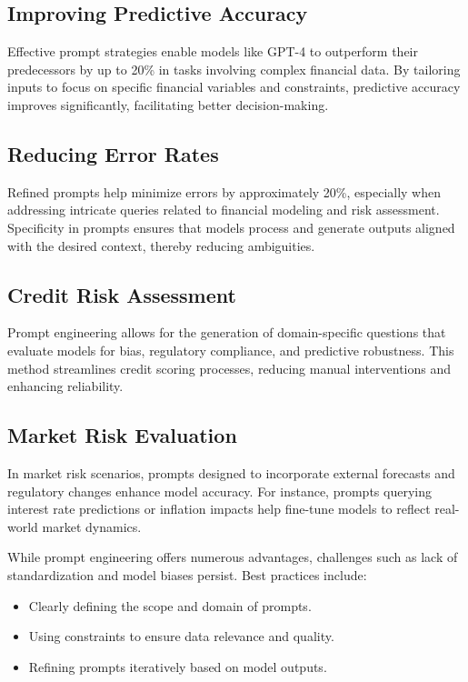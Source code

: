 \documentclass[a4paper,headinclude=on,footinclude=on,12pt,oneside]{scrbook}
\begin{document}
	
	\subsection{Improving Predictive Accuracy}
	Effective prompt strategies enable models like GPT-4 to outperform their predecessors by up to 20\% in tasks involving complex financial data. By tailoring inputs to focus on specific financial variables and constraints, predictive accuracy improves significantly, facilitating better decision-making.
	
	\subsection{Reducing Error Rates}
	Refined prompts help minimize errors by approximately 20\%, especially when addressing intricate queries related to financial modeling and risk assessment. Specificity in prompts ensures that models process and generate outputs aligned with the desired context, thereby reducing ambiguities.
	
	
	\subsection{Credit Risk Assessment}
	Prompt engineering allows for the generation of domain-specific questions that evaluate models for bias, regulatory compliance, and predictive robustness. This method streamlines credit scoring processes, reducing manual interventions and enhancing reliability.
	
	\subsection{Market Risk Evaluation}
	In market risk scenarios, prompts designed to incorporate external forecasts and regulatory changes enhance model accuracy. For instance, prompts querying interest rate predictions or inflation impacts help fine-tune models to reflect real-world market dynamics.
	
	While prompt engineering offers numerous advantages, challenges such as lack of standardization and model biases persist. Best practices include:
	\begin{itemize}
		\item Clearly defining the scope and domain of prompts.
		\item Using constraints to ensure data relevance and quality.
		\item Refining prompts iteratively based on model outputs.
	\end{itemize}
	
\end{document}
